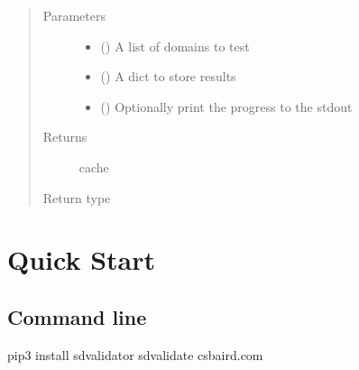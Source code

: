 \documentclass[a4paper,10pt,english,openany,oneside]{sphinxmanual}
\begin{document}
\begin{fulllineitems}
\begin{itemize}
\end{itemize}
\begin{quote}\begin{description}
\item[{Parameters}] \leavevmode\begin{itemize}
\item {} 
 () \textendash{} A list of domains to test

\item {} 
 () \textendash{} A dict to store results

\item {} 
 () \textendash{} Optionally print the progress to the stdout

\end{itemize}

\item[{Returns}] \leavevmode
cache

\item[{Return type}] \leavevmode
{}

\end{description}\end{quote}

\end{fulllineitems}



\chapter{Quick Start}
\label{\detokenize{index:quick-start}}

\section{Command line}
\label{\detokenize{index:command-line}}
\begin{sphinxVerbatim}[commandchars=\\\{\}]
 pip3 install sdvalidator
 sdvalidate csbaird.com
\end{sphinxVerbatim}
\end{document}

